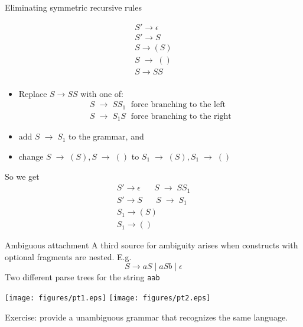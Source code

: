 \documentclass{prosper}%
\newcommand{\ra}{\mbox{$\;\rightarrow\;$}}
\begin{document}
\begin{slide}{Eliminating symmetric recursive rules}
\begin{minipage}{3cm}
\[
\begin{array}{l}
S'\rightarrow \epsilon\\
S'\rightarrow S\\
S\rightarrow (S)\\
S\ra ()\\

S \rightarrow SS\\
\end{array}
\]
\end{minipage}
\begin{minipage}{8cm}
\begin{itemize}
\item Replace    $S \rightarrow  SS$ with one of:
\[
\begin{array}{l}
    S \ra SS_1 \;\mbox{		 force branching to the left}\\
    S \ra S_1S 	\;\mbox{	 force branching to the right}
\end{array}
\]
\item add $S\ra S_1$ to the grammar, and 
\item change $S\ra (S), S\ra ()$ to $S_1\ra (S), S_1\ra ()$
\end{itemize}
\end{minipage}

\vspace{0.5cm}
So we get
\[
\begin{array}{l}
S'\rightarrow \epsilon\;\;\;\;\;\;S\ra SS_1\\
S'\rightarrow S\;\;\;\;\;\;S\ra S_1\\
S_1\rightarrow (S)\\
S_1\rightarrow ()
\end{array}
\]
\end{slide}


\begin{slide}{Ambiguous attachment}
A third source for ambiguity arises when constructs with optional fragments are nested. E.g.
\[
S \rightarrow aS \;|\; aSb\;|\;\epsilon
\]
Two different parse trees for the string {\tt aab}

\begin{center}
\texttt{[image: figures/pt1.eps]}
\hspace{1cm}
\texttt{[image: figures/pt2.eps]}
\end{center}
Exercise: provide a unambiguous grammar that recognizes the same language.
\end{slide}
\end{document}
